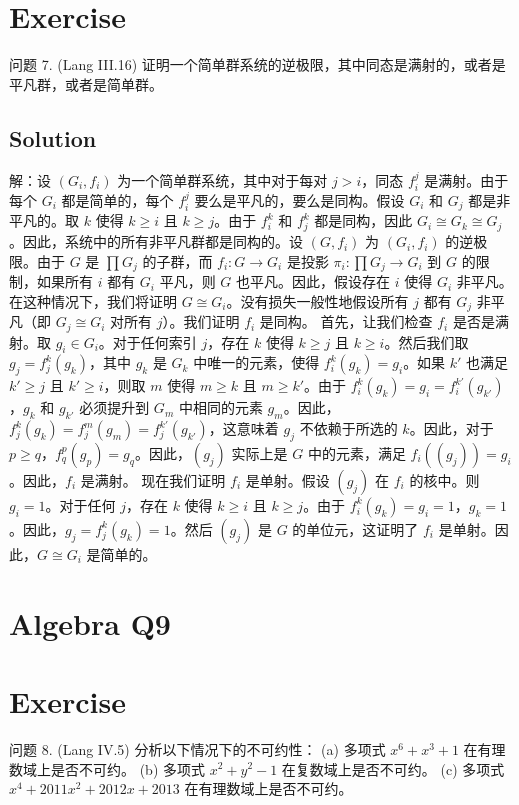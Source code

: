 \documentclass[12pt]{book}
\begin{document}
\section*{Exercise}
问题 7. (Lang III.16) 证明一个简单群系统的逆极限，其中同态是满射的，或者是平凡群，或者是简单群。



\subsection*{Solution}
解：设 $(G_i, f_i)$ 为一个简单群系统，其中对于每对 $j > i$，同态 $f_i^j$ 是满射。由于每个 $G_i$ 都是简单的，每个 $f_i^j$ 要么是平凡的，要么是同构。假设 $G_i$ 和 $G_j$ 都是非平凡的。取 $k$ 使得 $k \ge i$ 且 $k \ge j$。由于 $f_i^k$ 和 $f_j^k$ 都是同构，因此 $G_i \cong G_k \cong G_j$。因此，系统中的所有非平凡群都是同构的。设 $(G, f_i)$ 为 $(G_i, f_i)$ 的逆极限。由于 $G$ 是 $\prod G_j$ 的子群，而 $f_i: G \to G_i$ 是投影 $\pi_i: \prod G_j \to G_i$ 到 $G$ 的限制，如果所有 $i$ 都有 $G_i$ 平凡，则 $G$ 也平凡。因此，假设存在 $i$ 使得 $G_i$ 非平凡。在这种情况下，我们将证明 $G \cong G_i$。没有损失一般性地假设所有 $j$ 都有 $G_j$ 非平凡（即 $G_j \cong G_i$ 对所有 $j$）。我们证明 $f_i$ 是同构。
首先，让我们检查 $f_i$ 是否是满射。取 $g_i \in G_i$。对于任何索引 $j$，存在 $k$ 使得 $k \ge j$ 且 $k \ge i$。然后我们取 $g_j = f_j^k(g_k)$，其中 $g_k$ 是 $G_k$ 中唯一的元素，使得 $f_i^k(g_k) = g_i$。如果 $k'$ 也满足 $k' \ge j$ 且 $k' \ge i$，则取 $m$ 使得 $m \ge k$ 且 $m \ge k'$。由于 $f_i^k(g_k) = g_i = f_i^{k'}(g_{k'})$，$g_k$ 和 $g_{k'}$ 必须提升到 $G_m$ 中相同的元素 $g_m$。因此，$f_j^k(g_k) = f_j^m(g_m) = f_j^{k'}(g_{k'})$，这意味着 $g_j$ 不依赖于所选的 $k$。因此，对于 $p \ge q$，$f_q^p(g_p) = g_q$。因此，$(g_j)$ 实际上是 $G$ 中的元素，满足 $f_i((g_j)) = g_i$。因此，$f_i$ 是满射。
现在我们证明 $f_i$ 是单射。假设 $(g_j)$ 在 $f_i$ 的核中。则 $g_i = 1$。对于任何 $j$，存在 $k$ 使得 $k \ge i$ 且 $k \ge j$。由于 $f_i^k(g_k) = g_i = 1$，$g_k = 1$。因此，$g_j = f_j^k(g_k) = 1$。然后 $(g_j)$ 是 $G$ 的单位元，这证明了 $f_i$ 是单射。因此，$G \cong G_i$ 是简单的。
\newpage
\section{Algebra Q9}
\section*{Exercise}
问题 8. (Lang IV.5) 分析以下情况下的不可约性：
(a) 多项式 $x^6 + x^3 + 1$ 在有理数域上是否不可约。
(b) 多项式 $x^2 + y^2 - 1$ 在复数域上是否不可约。
(c) 多项式 $x^4 + 2011x^2 + 2012x + 2013$ 在有理数域上是否不可约。
\end{document}
